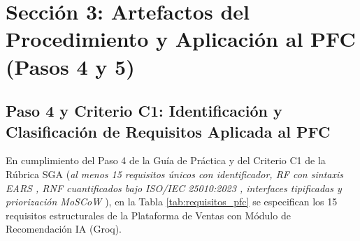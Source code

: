 \section{Sección 3: Artefactos del Procedimiento y Aplicación al PFC (Pasos 4 y 5)}

\subsection{Paso 4 y Criterio C1: Identificación y Clasificación de Requisitos Aplicada al PFC}
En cumplimiento del Paso 4 de la Guía de Práctica y del Criterio C1 de la Rúbrica SGA (\textit{al menos 15 requisitos únicos con identificador, RF con sintaxis EARS \cite{mavin2009ears}, RNF cuantificados bajo ISO/IEC 25010:2023 \cite{iso25010}, interfaces tipificadas y priorización MoSCoW \cite{ireb2023}}), en la Tabla \ref{tab:requisitos_pfc} se especifican los 15 requisitos estructurales de la Plataforma de Ventas con Módulo de Recomendación IA (Groq).

